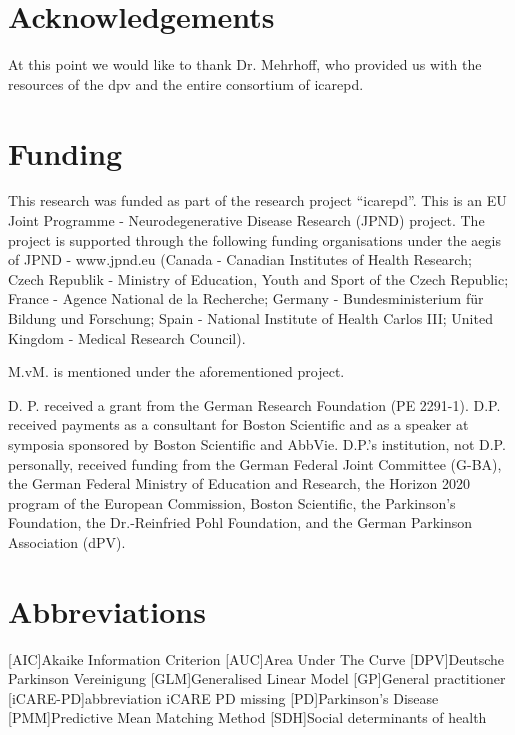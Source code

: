 \documentclass{bmcart}
\begin{document}
\begin{backmatter}

\section*{Acknowledgements}
At this point we would like to thank Dr. Mehrhoff, who provided us with the resources of the \ac{dpv} and the entire consortium of \ac{icarepd}.

\section*{Funding}%
This research was funded as part of the research project ``\ac{icarepd}''. This is an EU Joint Programme - Neurodegenerative Disease Research (JPND) project. The project is supported through the following funding organisations under the aegis of JPND - www.jpnd.eu (Canada - Canadian Institutes of Health Research; Czech Republik - Ministry of Education, Youth and Sport of the Czech Republic; France - Agence National de la Recherche; Germany - Bundesministerium für Bildung und Forschung; Spain - National Institute of Health Carlos III; United Kingdom - Medical Research Council). \newline

M.vM. is mentioned under the aforementioned project. \newline

D. P. received a grant from the German Research Foundation (PE 2291-1). D.P. received payments as a consultant for Boston Scientific and as a speaker at symposia sponsored by Boston Scientific and AbbVie. D.P.'s institution, not D.P. personally, received funding from the German Federal Joint Committee (G-BA), the German Federal Ministry of Education and Research, the Horizon 2020 program of the European Commission, Boston Scientific, the Parkinson’s Foundation, the Dr.-Reinfried Pohl Foundation, and the German Parkinson Association (dPV).

\section*{Abbreviations}
\begin{acronym}[ECU]
[AIC]{Akaike Information Criterion}
[AUC]{Area Under The Curve}
[DPV]{Deutsche Parkinson Vereinigung}
[GLM]{Generalised Linear Model}
[GP]{General practitioner}
[iCARE-PD]{abbreviation iCARE PD missing}
[PD]{Parkinson's Disease}
[PMM]{Predictive Mean Matching Method}
[SDH]{Social determinants of health}
\end{acronym}



\end{backmatter}
\end{document}
